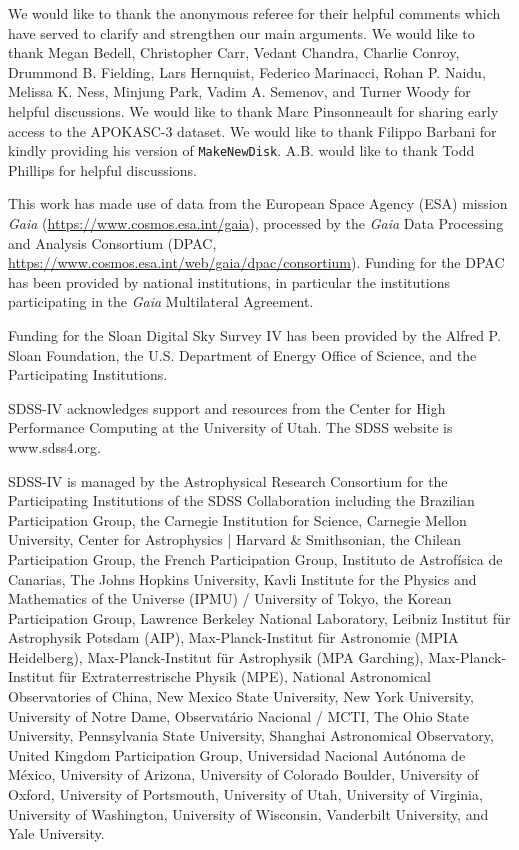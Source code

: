 \documentclass[twocolumn,linenumbers,trackchanges]{aastex631}
\begin{document}
\begin{acknowledgements}
We would like to thank the anonymous referee for their helpful comments which have served to clarify and strengthen our main arguments. We would like to thank Megan Bedell, Christopher Carr, Vedant Chandra, Charlie Conroy, Drummond B. Fielding, Lars Hernquist, Federico Marinacci, Rohan P. Naidu, Melissa K. Ness, Minjung Park, Vadim A. Semenov, and Turner Woody for helpful discussions. We would like to thank Marc Pinsonneault for sharing early access to the APOKASC-3 dataset. We would like to thank Filippo Barbani for kindly providing his version of \texttt{MakeNewDisk}. A.B. would like to thank Todd Phillips for helpful discussions.

This work has made use of data from the European Space Agency (ESA) mission {\it Gaia} (\url{https://www.cosmos.esa.int/gaia}), processed by the {\it Gaia} Data Processing and Analysis Consortium (DPAC, \url{https://www.cosmos.esa.int/web/gaia/dpac/consortium}). Funding for the DPAC has been provided by national institutions, in particular the institutions participating in the {\it Gaia} Multilateral Agreement.

Funding for the Sloan Digital Sky 
Survey IV has been provided by the 
Alfred P. Sloan Foundation, the U.S. 
Department of Energy Office of 
Science, and the Participating 
Institutions. 

SDSS-IV acknowledges support and 
resources from the Center for High 
Performance Computing  at the 
University of Utah. The SDSS 
website is www.sdss4.org.

SDSS-IV is managed by the 
Astrophysical Research Consortium 
for the Participating Institutions 
of the SDSS Collaboration including 
the Brazilian Participation Group, 
the Carnegie Institution for Science, 
Carnegie Mellon University, Center for 
Astrophysics | Harvard \& 
Smithsonian, the Chilean Participation 
Group, the French Participation Group, 
Instituto de Astrof\'isica de 
Canarias, The Johns Hopkins 
University, Kavli Institute for the 
Physics and Mathematics of the 
Universe (IPMU) / University of 
Tokyo, the Korean Participation Group, 
Lawrence Berkeley National Laboratory, 
Leibniz Institut f\"ur Astrophysik 
Potsdam (AIP),  Max-Planck-Institut 
f\"ur Astronomie (MPIA Heidelberg), 
Max-Planck-Institut f\"ur 
Astrophysik (MPA Garching), 
Max-Planck-Institut f\"ur 
Extraterrestrische Physik (MPE), 
National Astronomical Observatories of 
China, New Mexico State University, 
New York University, University of 
Notre Dame, Observat\'ario 
Nacional / MCTI, The Ohio State 
University, Pennsylvania State 
University, Shanghai 
Astronomical Observatory, United 
Kingdom Participation Group, 
Universidad Nacional Aut\'onoma 
de M\'exico, University of Arizona, 
University of Colorado Boulder, 
University of Oxford, University of 
Portsmouth, University of Utah, 
University of Virginia, University 
of Washington, University of 
Wisconsin, Vanderbilt University, 
and Yale University.


\end{acknowledgements}
\end{document}
